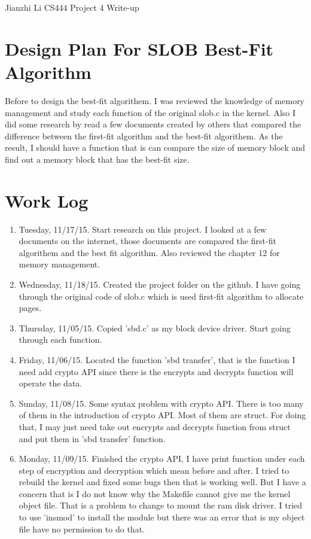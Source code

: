 \documentclass[letterpaper,11pt,titlepage]{article}
\begin{document}
Jianzhi Li\newline
CS444 Project 4 Write-up

\section{Design Plan For SLOB Best-Fit Algorithm}

Before to design the best-fit algorithem. I was reviewed the knowledge of memory management and study each function of the original slob.c in the kernel. Also I did 
some research by read a few documents created by others that compared the difference between the first-fit algorithm and the best-fit algorithem. As the result, I should have a 
function that is can compare the size of memory block and find out a memory block that has the best-fit size. 
    




\section{Work Log}
\begin{enumerate}

\item Tuesday, 11/17/15. Start research on this project. I looked at a few documents on the internet, those documents are compared the first-fit algorithem and the best fit algorithm. Also reviewed the chapter 12 for memory management.

\item Wednesday, 11/18/15. Created the project folder on the github. I have going through the original code of slob.c which is used first-fit algorithm to allocate pages. 
\item Thursday, 11/05/15. Copied 'sbd.c' as my block device driver. Start going through each function.

\item Friday, 11/06/15. Located the function 'sbd transfer', that is the function I need add crypto API since there is the encrypts and decrypts function will operate the data. 
\item Sunday, 11/08/15. Some syntax problem with crypto API. There is too many of them in the introduction of crypto API. Most of them are struct. For doing that, I may just need take out encrypts and decrypts function from struct and put them in 'sbd transfer' function.

\item Monday, 11/09/15. Finished the crypto API, I have print function under each step of encryption and decryption which mean before and after. I tried to rebuild the kernel and fixed some bugs then that is working well. But I have a concern that is I do not know why the Makefile cannot give me the kernel object file. That is a problem to change to mount the ram disk driver. 
I tried to use 'insmod' to install the module but there was an error that is my object file have no permission to do that. 

\end{enumerate}
\end{document}
